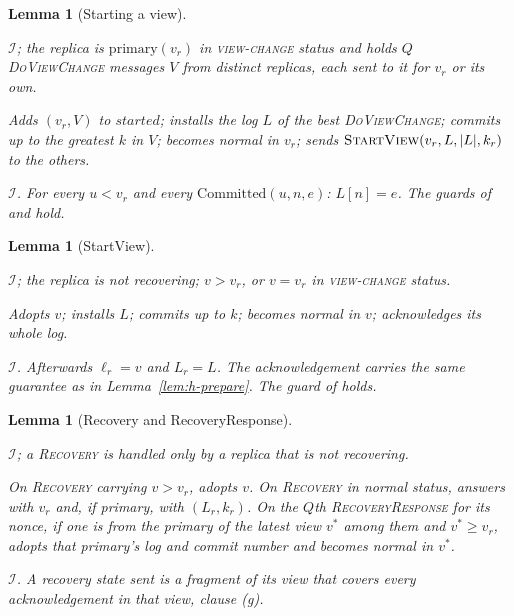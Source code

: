 \documentclass[11pt,a4paper]{article}
\theoremstyle{plain}
\newtheorem{lemma}[theorem]{Lemma}
\theoremstyle{definition}
\theoremstyle{remark}
\newcommand{\msg}[1]{\textsc{#1}}
\newcommand{\dvc}{\msg{DoViewChange}}
\newcommand{\Inv}{\mathcal{I}}
\newcommand{\Committed}{\mathrm{Committed}}
\newcommand{\primary}{\mathrm{primary}}
\newcommand{\started}{\mathit{started}}
\newcommand{\viewchange}{\textsc{view-change}}
\begin{document}
\begin{lemma}[Starting a view]
\label{lem:h-start}
\begin{iface}
  \item[Precondition] $\Inv$; the replica is $\primary(v_r)$ in
    \viewchange{} status and holds $Q$ \dvc{} messages $V$ from distinct
    replicas,
    each sent to it for $v_r$ or its own.
  \item[Effect] Adds $(v_r, V)$ to $\started$; installs the log $L$ of
    the best \dvc{}; commits up to the greatest $k$ in $V$; becomes normal
    in $v_r$; sends $\msg{StartView}(v_r, L, |L|, k_r)$ to the others.
  \item[Guarantee] $\Inv$. For every $u < v_r$ and every
    $\Committed(u, n, e)$: $L[n] = e$. The guards of
     and  hold.
\end{iface}
\end{lemma}

\begin{lemma}[StartView]
\label{lem:h-startview}
\begin{iface}
  \item[Precondition] $\Inv$; the replica is not recovering; $v > v_r$,
    or $v = v_r$ in \viewchange{} status.
  \item[Effect] Adopts $v$; installs $L$; commits up to $k$; becomes
    normal in $v$; acknowledges its whole log.
  \item[Guarantee] $\Inv$. Afterwards $\ell_r = v$ and $L_r = L$. The
    acknowledgement carries the same guarantee as in
    Lemma~\ref{lem:h-prepare}. The guard of  holds.
\end{iface}
\end{lemma}

\begin{lemma}[Recovery and RecoveryResponse]
\label{lem:h-recovery}
\begin{iface}
  \item[Precondition] $\Inv$; a \msg{Recovery} is handled only by a
    replica that is not recovering.
  \item[Effect] On \msg{Recovery} carrying $v > v_r$, adopts $v$. On
    \msg{Recovery} in normal status, answers with $v_r$ and, if primary,
    with $(L_r, k_r)$. On the $Q$th \msg{RecoveryResponse} for its nonce,
    if one is from the primary of the latest view $v^*$ among them and
    $v^* \ge v_r$, adopts that primary's log and commit number and becomes
    normal in $v^*$.
  \item[Guarantee] $\Inv$. A recovery state sent is a fragment of its
    view that covers every acknowledgement in that view, clause (g).
\end{iface}
\end{lemma}
\end{document}
